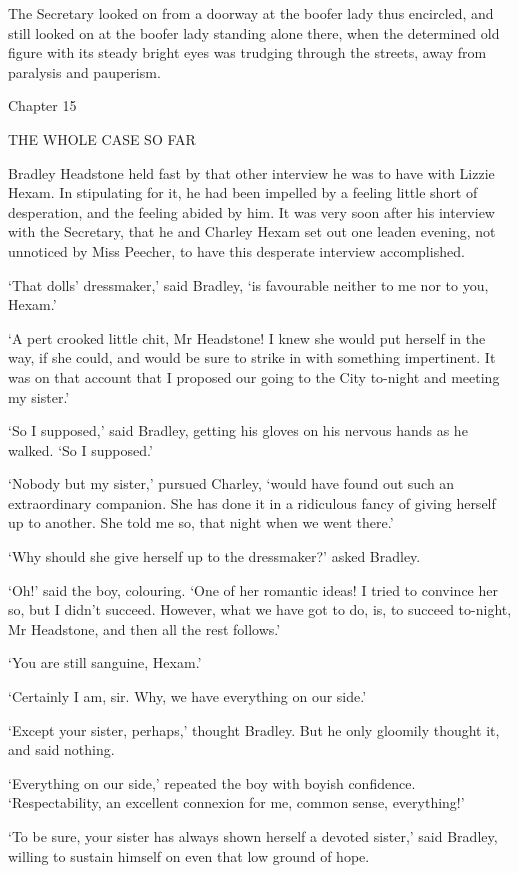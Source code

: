 The Secretary looked on from a doorway at the boofer lady thus
encircled, and still looked on at the boofer lady standing alone there,
when the determined old figure with its steady bright eyes was trudging
through the streets, away from paralysis and pauperism.



Chapter 15

THE WHOLE CASE SO FAR


Bradley Headstone held fast by that other interview he was to have with
Lizzie Hexam. In stipulating for it, he had been impelled by a feeling
little short of desperation, and the feeling abided by him. It was very
soon after his interview with the Secretary, that he and Charley Hexam
set out one leaden evening, not unnoticed by Miss Peecher, to have this
desperate interview accomplished.

‘That dolls’ dressmaker,’ said Bradley, ‘is favourable neither to me nor
to you, Hexam.’

‘A pert crooked little chit, Mr Headstone! I knew she would put herself
in the way, if she could, and would be sure to strike in with something
impertinent. It was on that account that I proposed our going to the
City to-night and meeting my sister.’

‘So I supposed,’ said Bradley, getting his gloves on his nervous hands
as he walked. ‘So I supposed.’

‘Nobody but my sister,’ pursued Charley, ‘would have found out such an
extraordinary companion. She has done it in a ridiculous fancy of giving
herself up to another. She told me so, that night when we went there.’

‘Why should she give herself up to the dressmaker?’ asked Bradley.

‘Oh!’ said the boy, colouring. ‘One of her romantic ideas! I tried to
convince her so, but I didn’t succeed. However, what we have got to do,
is, to succeed to-night, Mr Headstone, and then all the rest follows.’

‘You are still sanguine, Hexam.’

‘Certainly I am, sir. Why, we have everything on our side.’

‘Except your sister, perhaps,’ thought Bradley. But he only gloomily
thought it, and said nothing.

‘Everything on our side,’ repeated the boy with boyish confidence.
‘Respectability, an excellent connexion for me, common sense,
everything!’

‘To be sure, your sister has always shown herself a devoted sister,’
said Bradley, willing to sustain himself on even that low ground of
hope.

